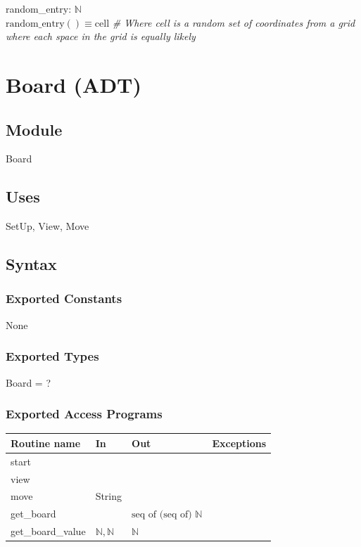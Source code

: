 \documentclass[12pt]{article}
\begin{document}
\noindent random\_entry:  \rightarrow {} $\mathbb{N}$\\
\noindent $\mbox{random\_entry}() \equiv \text{cell} $
\textit{\# Where cell is a random set of coordinates from a grid where each space in the grid is equally likely}~\\

\newpage

\section* {Board (ADT)}

\subsection*{Module}

Board

\subsection* {Uses}

SetUp, View, Move

\subsection* {Syntax}

\subsubsection* {Exported Constants}

None

\subsubsection* {Exported Types}

Board = ?

\subsubsection* {Exported Access Programs}

\begin{tabular}{| l | l | l | p{5cm} |}
  \hline
  \textbf{Routine name} & \textbf{In} & \textbf{Out} & \textbf{Exceptions}\\
  \hline
  start & & & & \\
  \hline
  view & & & \\
  \hline
  move & String & & \\
  \hline
  get\_board & & $\text{seq of (seq of) } \mathbb{N}$ & \\
  \hline
  get\_board\_value & $\mathbb{N}, \mathbb{N}$ & $\mathbb{N}$ & \\
  \hline
  
\end{tabular}
\end{document}
